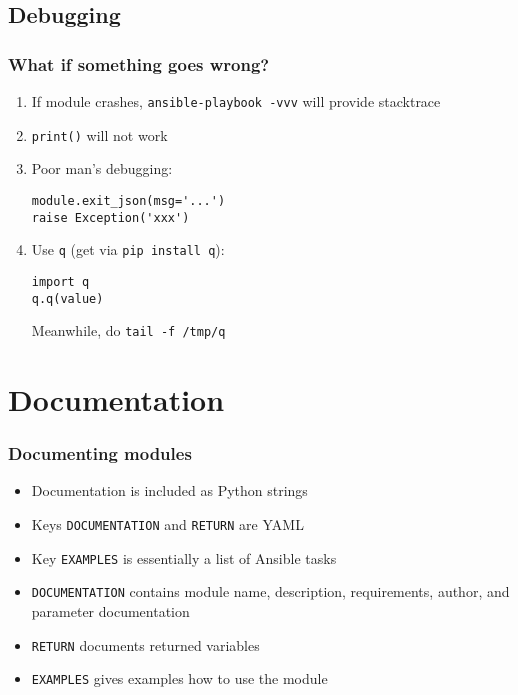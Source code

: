 \documentclass{beamer}
\begin{document}
  \subsection{Debugging}
  \begin{frame}[fragile]
    \frametitle{What if something goes wrong?}
    \begin{enumerate}
      \item If module crashes, \lstinline{ansible-playbook -vvv}
      will provide stacktrace
      \item<2-> \lstinline{print()} will not work
      \item<3-> Poor man's debugging:
\begin{lstlisting}[numbers=none]
module.exit_json(msg='...')
raise Exception('xxx')
\end{lstlisting}
      \item<4-> Use \lstinline{q} (get via \lstinline{pip install q}):
\begin{lstlisting}[numbers=none]
import q
q.q(value)
\end{lstlisting}
      Meanwhile, do \lstinline{tail -f /tmp/q}
    \end{enumerate}
  \end{frame}

  \section{Documentation}
  \begin{frame}[fragile]
    \frametitle{Documenting modules}
    \begin{itemize}
      \item Documentation is included as Python strings
      \item Keys \lstinline{DOCUMENTATION} and \lstinline{RETURN} are YAML
      \item Key \lstinline{EXAMPLES} is essentially a list of Ansible tasks

      \vspace{0.5cm}
      \item<2-> \lstinline{DOCUMENTATION} contains module name, description, requirements, author, and parameter documentation
      \item<2-> \lstinline{RETURN} documents returned variables
      \item<2-> \lstinline{EXAMPLES} gives examples how to use the module
    \end{itemize}
  \end{frame}
\end{document}
